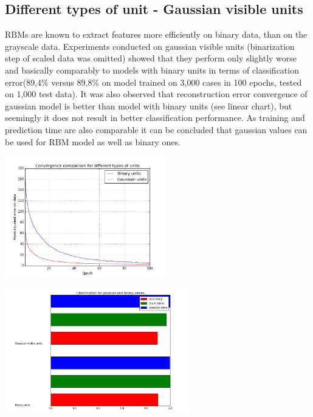 \documentclass[a4paper]{scrartcl}
\begin{document}
\subsection{Different types of unit - Gaussian visible units}
RBMs are known to extract features more efficiently on binary data, than on the grayscale data. Experiments conducted on gaussian visible units (binarization step of scaled data was omitted) showed that they perform only slightly worse and basically comparably to models with binary units in terms of classification error(89,4\% versus 89,8\% on model trained on 3,000 cases in 100 epochs, tested on 1,000 test data). It was also observed that reconstruction error convergence of gaussian model is better than model with binary units (see linear chart), but seemingly it does not result in better classification performance. As training and prediction time are also comparable it can be concluded that gaussian values can be used for RBM model as well as binary ones. 
\par
\vspace{1em}
\begin{minipage}[t]{0.5\textwidth}
\includegraphics[width=7cm]{images/dataTypes.png}
\end{minipage}
\begin{minipage}[t]{0.5\textwidth}
\includegraphics[width=8cm]{images/gaussian_binary.png}
\end{minipage}
\end{document}
